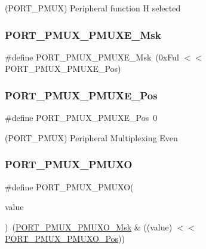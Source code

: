(P\+O\+R\+T\+\_\+\+P\+M\+UX) Peripheral function H selected 

\mbox{\label{group___s_a_m_d21___p_o_r_t_gae955cb77e730b16d702cd0fcdb156ec4}} 
\subsubsection{\texorpdfstring{PORT\_PMUX\_PMUXE\_Msk}{PORT\_PMUX\_PMUXE\_Msk}}
{\footnotesize\ttfamily \#define P\+O\+R\+T\+\_\+\+P\+M\+U\+X\+\_\+\+P\+M\+U\+X\+E\+\_\+\+Msk~(0x\+Ful $<$$<$ P\+O\+R\+T\+\_\+\+P\+M\+U\+X\+\_\+\+P\+M\+U\+X\+E\+\_\+\+Pos)}

\mbox{\label{group___s_a_m_d21___p_o_r_t_ga38a4c4871ecabeb4ad36398b73685bac}} 
\subsubsection{\texorpdfstring{PORT\_PMUX\_PMUXE\_Pos}{PORT\_PMUX\_PMUXE\_Pos}}
{\footnotesize\ttfamily \#define P\+O\+R\+T\+\_\+\+P\+M\+U\+X\+\_\+\+P\+M\+U\+X\+E\+\_\+\+Pos~0}



(P\+O\+R\+T\+\_\+\+P\+M\+UX) Peripheral Multiplexing Even 

\mbox{\label{group___s_a_m_d21___p_o_r_t_ga9e83be4ac2a68323e1910518c9290f21}} 
\subsubsection{\texorpdfstring{PORT\_PMUX\_PMUXO}{PORT\_PMUX\_PMUXO}}
{\footnotesize\ttfamily \#define P\+O\+R\+T\+\_\+\+P\+M\+U\+X\+\_\+\+P\+M\+U\+XO(\begin{DoxyParamCaption}\item[{}]{value }\end{DoxyParamCaption})~(\mbox{\hyperlink{group___s_a_m_d21___p_o_r_t_gafd360b4eecfb7fb93fde5c9e1c6da3a0}{P\+O\+R\+T\+\_\+\+P\+M\+U\+X\+\_\+\+P\+M\+U\+X\+O\+\_\+\+Msk}} \& ((value) $<$$<$ \mbox{\hyperlink{group___s_a_m_d21___p_o_r_t_ga80a28619ad2db553b64d4ce4545368d3}{P\+O\+R\+T\+\_\+\+P\+M\+U\+X\+\_\+\+P\+M\+U\+X\+O\+\_\+\+Pos}}))}

